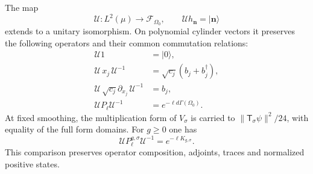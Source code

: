 \begin{proposition}\label{mht:prop:scalar-fock-unitary}
The map
\[
 \mathcal U:L^2(\mu)\longrightarrow\mathcal F_{\Omega_0},
 \qquad \mathcal U h_{\mathbf n}=|\mathbf n\rangle
\]
extends to a unitary isomorphism. On polynomial cylinder vectors it
preserves the following operators and their common commutation relations:
\begin{align*}
 \mathcal U1&=|0\rangle,\\
 \mathcal U\,x_j\,\mathcal U^{-1}
       &=\sqrt{c_j}(b_j+b_j^\dagger),\\
 \mathcal U\,\sqrt{c_j}\partial_{x_j}\,\mathcal U^{-1}&=b_j,\\
 \mathcal UP_\ell\mathcal U^{-1}&=e^{-\ell d\Gamma(\Omega_0)}.
\end{align*}
At fixed smoothing, the multiplication form of $V_\sigma$ is carried to
$\|\mathsf T_\sigma\psi\|^2/24$, with equality of the full form
domains. For $g\geq0$ one has
\begin{equation}\label{mht:eq:scalar-interacting-unitary}
 \mathcal U P_\ell^{g,\sigma}\mathcal U^{-1}
                       =e^{-\ell K_{g,\sigma}}.
\end{equation}
This comparison preserves operator composition, adjoints, traces
and normalized positive states.
\end{proposition}
